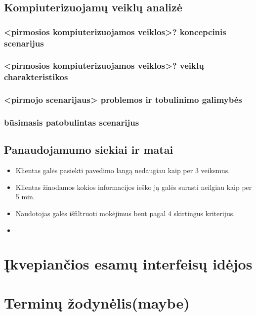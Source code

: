 \documentclass{VUMIFPSkursinis}
\begin{document}
\subsection{Kompiuterizuojamų veiklų analizė}
\subsubsection{<pirmosios kompiuterizuojamos veiklos>? koncepcinis scenarijus}
\subsubsection{<pirmosios kompiuterizuojamos veiklos>? veiklų charakteristikos}
\subsubsection{<pirmojo scenarijaus> problemos ir tobulinimo galimybės}
\subsubsection{būsimasis patobulintas scenarijus}
\subsection{Panaudojamumo siekiai ir matai}
\begin{itemize}
	\item Klientas galės pasiekti pavedimo langą nedaugiau kaip per 3 veiksmus.
	\item Klientas žinodamos kokios informacijos ieško ją galės surasti neilgiau kaip per 5 min.
	\item Naudotojas galės išfiltruoti mokėjimus bent pagal 4 skirtingus kriterijus.
	\item 
\end{itemize}
\section{Įkvepiančios esamų interfeisų idėjos}
\section{Terminų žodynėlis(maybe)}
\end{document}

